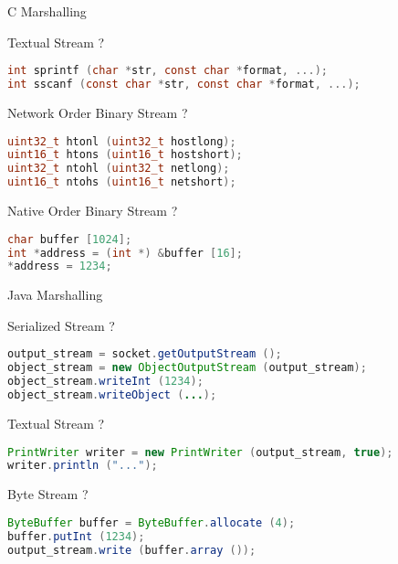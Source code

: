 \begin{frame}[fragile]{C Marshalling}
    \begin{block}{Textual Stream ?}
\begin{lstlisting}[language=c,style=mini]
int sprintf (char *str, const char *format, ...);
int sscanf (const char *str, const char *format, ...);
\end{lstlisting}
    \end{block}
    \begin{block}{Network Order Binary Stream ?}
\begin{lstlisting}[language=c,style=mini]
uint32_t htonl (uint32_t hostlong);
uint16_t htons (uint16_t hostshort);
uint32_t ntohl (uint32_t netlong);
uint16_t ntohs (uint16_t netshort);
\end{lstlisting}
    \end{block}
    \begin{block}{Native Order Binary Stream ?}
\begin{lstlisting}[language=c,style=mini]
char buffer [1024];
int *address = (int *) &buffer [16];
*address = 1234;
\end{lstlisting}
    \end{block}
\end{frame}


\begin{frame}[fragile]{Java Marshalling}
    \begin{block}{Serialized Stream ?}
\begin{lstlisting}[language=java,style=mini]
output_stream = socket.getOutputStream ();
object_stream = new ObjectOutputStream (output_stream);
object_stream.writeInt (1234);
object_stream.writeObject (...);
\end{lstlisting}
    \end{block}
    \begin{block}{Textual Stream ?}
\begin{lstlisting}[language=java,style=mini]
PrintWriter writer = new PrintWriter (output_stream, true);
writer.println ("...");
\end{lstlisting}
    \end{block}
    \begin{block}{Byte Stream ?}
\begin{lstlisting}[language=java,style=mini]
ByteBuffer buffer = ByteBuffer.allocate (4);
buffer.putInt (1234);
output_stream.write (buffer.array ());
\end{lstlisting}
    \end{block}
\end{frame}



